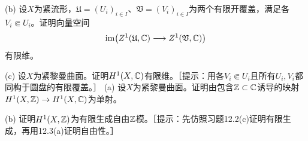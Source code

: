 (b) 设$X$为紧流形，$\mathfrak U=(U_i)_{i\in I}$、$\mathfrak V=(V_i)_{i\in I}$为两个有限开覆盖，满足各$V_i\Subset U_i$。证明向量空间
\[
\operatorname{im}\bigl(Z^1(\mathfrak U,\mathbb C)\longrightarrow Z^1(\mathfrak V,\mathbb C)\bigr)
\]
有限维。

(c) 设$X$为紧黎曼曲面。证明$H^1(X,\mathbb C)$有限维。［提示：用各$V_i\Subset U_i$且所有$U_i,V_i$都同构于圆盘的有限覆盖。］
(a) 设$X$为紧黎曼曲面。证明由包含$\mathbb Z\subset\mathbb C$诱导的映射$H^1(X,\mathbb Z)\to H^1(X,\mathbb C)$为单射。

(b) 证明$H^1(X,\mathbb Z)$为有限生成自由$\mathbb Z$模。［提示：先仿照习题12.2(c)证明有限生成，再用12.3(a)证明自由性。］
